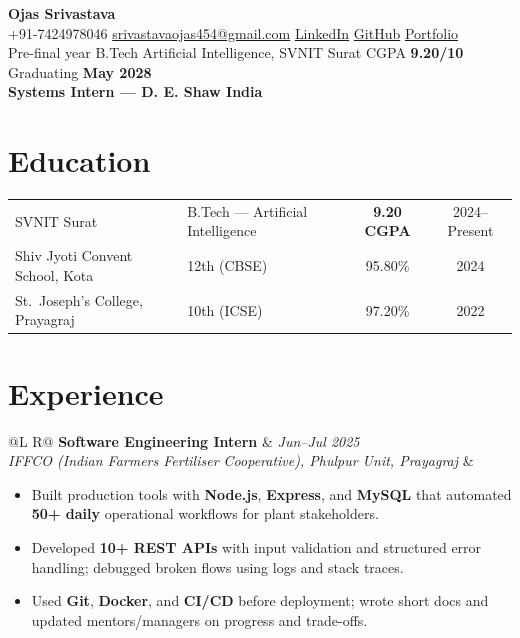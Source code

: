 \documentclass[a4paper,10pt]{article}
\makeatletter
\newcommand{\job}[4]{%
  \vspace{1mm}
  \noindent\begin{tabularx}{\textwidth}{@{}L R@{}}
    \textbf{#1} & \textit{\small #2} \\
    \textit{\small #3} & \\
  \end{tabularx}\par
  \vspace{0.5mm}%
}
\makeatother
\begin{document}
\selectfont

\begin{center}
  {\LARGE \textbf{Ojas Srivastava}} \\[1.2mm]
  \small
  +91-7424978046 \textbar{}
  \href{mailto:srivastavaojas454@gmail.com}{srivastavaojas454@gmail.com} \textbar{}
  \href{https://linkedin.com/in/ojas-srivastava05}{LinkedIn} \textbar{}
  \href{https://github.com/Ojas-Srivastava05}{GitHub} \textbar{}
  \href{https://ojas-srivastava.vercel.app}{Portfolio} \\[0.6mm]
  Pre-final year \textbar{} B.Tech Artificial Intelligence, SVNIT Surat \textbar{} CGPA \textbf{9.20/10} \textbar{} Graduating \textbf{May 2028} \\[0.4mm]
  \textbf{Systems Intern --- D. E. Shaw India}
\end{center}

\section{Education}
\noindent
{\setlength{\rightskip}{0pt}%
\setlength{\leftskip}{0pt}%
\renewcommand{\arraystretch}{1.15}%
\begin{tabularx}{\textwidth}{@{}X X c c@{}}
SVNIT Surat & B.Tech --- Artificial Intelligence & \textbf{9.20 CGPA} & 2024--Present \\
Shiv Jyoti Convent School, Kota & 12th (CBSE) & 95.80\% & 2024 \\
St.\ Joseph's College, Prayagraj & 10th (ICSE) & 97.20\% & 2022 \\
\end{tabularx}}
\vspace{1.5mm}

\section{Experience}
\job{Software Engineering Intern}{Jun--Jul 2025}{IFFCO (Indian Farmers Fertiliser Cooperative), Phulpur Unit, Prayagraj}{}
\begin{itemize}
  \item Built production tools with \textbf{Node.js}, \textbf{Express}, and \textbf{MySQL} that automated \textbf{50+ daily} operational workflows for plant stakeholders.
  \item Developed \textbf{10+ REST APIs} with input validation and structured error handling; debugged broken flows using logs and stack traces.
  \item Used \textbf{Git}, \textbf{Docker}, and \textbf{CI/CD} before deployment; wrote short docs and updated mentors/managers on progress and trade-offs.
\end{itemize}
\end{document}
